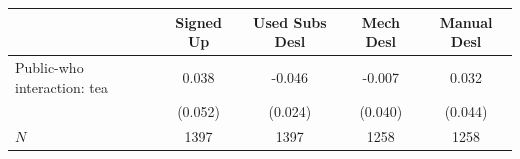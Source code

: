 \begin{tabular}{lcccc}
\hline\hline
 & Signed Up & Used Subs Desl & Mech Desl & Manual Desl \\
\hline
Public-who interaction: tea & 0.038 & -0.046 & -0.007 & 0.032 \\
 & (0.052) & (0.024) & (0.040) & (0.044) \\
\hline
$N$ & 1397 & 1397 & 1258 & 1258 \\
\hline\hline
\end{tabular}

